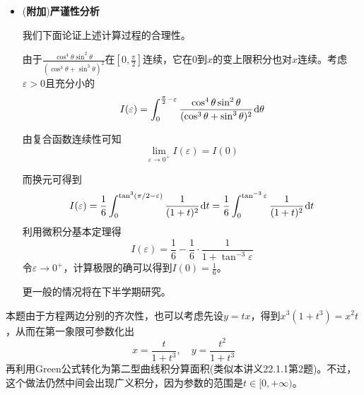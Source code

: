 \documentclass[a4paper,UTF8,fontset=windows,AutoFakeBold]{ctexart}
\newcommand*{\dr}{\hspace{0.07em}\mathrm{d}}
\newcommand*{\extra}{\textbf{附加}}
\newcommand*{\note}{\noindent *}
\theoremstyle{ex}
\begin{document}
\begin{framed}
{\begin{itemize}
        对$r$积分可将其化为定积分
        $$\frac{1}{2}\int_0^{\pi/2}\frac{\cos^2\theta\sin^2\theta}{(\cos^3\theta+\sin^3\theta)^2}\dr\theta$$
        至此已经是三角函数的有理函数的形式，可以利用万能代换强行计算。不过，设被积函数为$R(\cos\theta,\sin\theta)$，我们可以发现$R(\cos\theta,\sin\theta)=R(-\cos\theta,-\sin\theta)$，此时\textbf{一定可以}用$t=\tan\theta$代换。具体来说，我们强行从前面提出$\cos^{-2}\theta$可以将积分写为
        $$\frac{1}{2}\int_0^{\pi/2}\frac{\cos^4\theta\sin^2\theta}{(\cos^3\theta+\sin^3\theta)^2}\dr\tan\theta$$
        分子分母同除以$\cos^6\theta$即将其写为了
        $$\frac{1}{2}\int_0^{\pi/2}\frac{\tan^2\theta}{(1+\tan^3\theta)^2}\dr\tan\theta$$
        由此可进一步写为
        $$\frac{1}{6}\int_0^{\pi/2}\frac{1}{(1+\tan^3\theta)^2}\dr\tan^3\theta$$
        我们试着换元$t=\tan^3\theta$，这时上限将变为$\tan\frac{\pi}{2}$，从极限的角度这应该是$+\infty$，暂且忽略严谨性问题，得到形式上的结果
        $$\frac{1}{6}\int_0^{+\infty}\frac{1}{(1+t)^2}\dr t$$
        此时，被积函数的一个原函数是$-\frac{1}{1+t}$，它在0处是$-1$，而无穷处的极限是0，可以形式上用微积分基本定理得到结果
        $$\frac{1}{6}(0-(-1))=\frac{1}{6}$$

        \item (\extra)\textbf{严谨性分析}

        我们下面论证上述计算过程的合理性。
        
        由于$\frac{\cos^4\theta\sin^2\theta}{(\cos^3\theta+\sin^3\theta)^2}$在$[0,\frac{\pi}{2}]$连续，它在0到$x$的变上限积分也对$x$连续。考虑$\varepsilon>0$且充分小的
        $$I(\varepsilon)=\int_0^{\frac{\pi}{2}-\varepsilon}\frac{\cos^4\theta\sin^2\theta}{(\cos^3\theta+\sin^3\theta)^2}\dr\theta$$

        由复合函数连续性可知
        $$\lim_{\varepsilon\to0^+}I(\varepsilon)=I(0)$$
        
        而换元可得到
        $$I(\varepsilon)=\frac{1}{6}\int_0^{\tan^3(\pi/2-\varepsilon)}\frac{1}{(1+t)^2}\dr t=\frac{1}{6}\int_0^{\tan^{-3}\varepsilon}\frac{1}{(1+t)^2}\dr t$$
        利用微积分基本定理得
        $$I(\varepsilon)=\frac{1}{6}-\frac{1}{6}\cdot\frac{1}{1+\tan^{-3}\varepsilon}$$
        令$\varepsilon\to0^+$，计算极限的确可以得到$I(0)=\frac{1}{6}$。

        \note 更一般的情况将在下半学期研究。
    \end{itemize}

    \note 本题由于方程两边分别的齐次性，也可以考虑先设$y=tx$，得到$x^3(1+t^3)=x^2t$，从而在第一象限可参数化出
    $$x=\frac{t}{1+t^3},\quad y=\frac{t^2}{1+t^3}$$
    再利用Green公式转化为第二型曲线积分算面积(类似本讲义22.1.1第2题)。不过，这个做法仍然中间会出现广义积分，因为参数的范围是$t\in[0,+\infty)$。
}
\end{framed}
\end{document}
